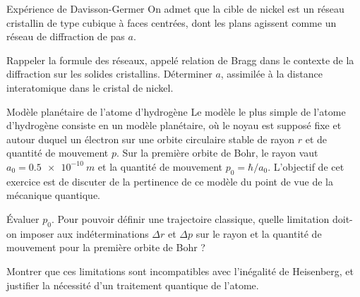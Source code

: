 \begin{exo}[PC][2][TD]{Expérience de Davisson-Germer}
  On admet que la cible de nickel est un réseau cristallin de type cubique à faces centrées, dont les plans agissent comme un réseau de diffraction de pas $a$.
  \begin{quest}
    \item	Rappeler la formule des réseaux, appelé relation de Bragg dans le contexte de la diffraction sur les solides cristallins. Déterminer $a$, assimilée à la distance interatomique dans le cristal de nickel.
  \end{quest}
\end{exo}


\begin{exo}[PC][1][TD]{Modèle planétaire de l'atome d'hydrogène}
Le modèle le plus simple de l'atome d'hydrogène consiste en un modèle planétaire, où le noyau est supposé fixe et autour duquel  un électron sur une orbite circulaire stable de rayon $r$ et de quantité de mouvement $p$. Sur la première orbite de Bohr, le rayon vaut $ a_0=\SI{0.5e-10}{m}$ et la quantité de mouvement $p_0=\hbar/a_0$.
L'objectif de cet exercice est de discuter de la pertinence de ce modèle du point de vue de la mécanique quantique.
\begin{quest}
\item Évaluer $p_0$. Pour pouvoir définir une trajectoire classique, quelle limitation doit-on imposer aux indéterminations $\Delta r$ et $\Delta p$ sur le rayon et la quantité de mouvement pour la première orbite de Bohr ?
 
\item Montrer que ces limitations sont incompatibles avec l'inégalité de Heisenberg, et justifier la nécessité d'un traitement quantique de l'atome.
\end{quest}
\end{exo}

